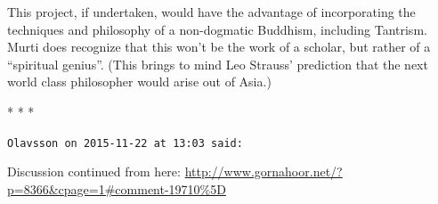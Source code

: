 This project, if undertaken, would have the advantage of incorporating the techniques and philosophy of a non-dogmatic Buddhism, including Tantrism. Murti does recognize that this won't be the work of a scholar, but rather of a ``spiritual genius''. (This brings to mind Leo Strauss' prediction that the next world class philosopher would arise out of Asia.)



\begin{center}* * *\end{center}

\begin{footnotesize}
\begin{sffamily}

\texttt{Olavsson on 2015-11-22 at 13:03 said:} 

Discussion continued from here:
\url{http://www.gornahoor.net/?p=8366\&cpage=1\#comment-19710\%5D}


\end{sffamily}
\end{footnotesize}
